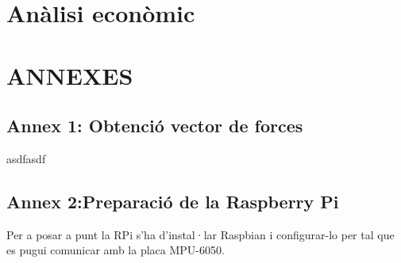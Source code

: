 \documentclass[twoside]{article}
\begin{document}


\newpage
\section{Anàlisi econòmic}

\newpage
\section*{ANNEXES}
\subsection*{Annex 1: Obtenció vector de forces}
asdfasdf 
\newpage

\subsection*{Annex 2:Preparació de la Raspberry Pi}
Per a posar a punt la RPi s'ha d'instal·lar Raspbian i configurar-lo per tal que es pugui comunicar amb la placa MPU-6050.
\end{document}
